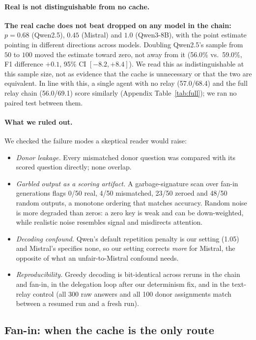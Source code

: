 \documentclass[11pt]{article}
\begin{document}
\paragraph{Real is not distinguishable from no cache.} \textbf{The real cache does
not beat dropped on any model in the chain:} $p=0.68$ (Qwen2.5), $0.45$ (Mistral) and
$1.0$ (Qwen3-8B), with the point estimate pointing in different
directions across models. Doubling Qwen2.5's sample from $50$ to $100$
moved the estimate toward zero, not away from it (56.0\% vs.\ 59.0\%, F1
difference $+0.1$, 95\% CI $[-8.2,+8.4]$). We read this as
indistinguishable at this sample size, not as evidence that the cache is
unnecessary or that the two are equivalent. In line with this, a single
agent with no relay (57.0/68.4) and the full relay chain (56.0/69.1) score
similarly (Appendix Table~\ref{tab:full}); we ran no paired test between
them.

\paragraph{What we ruled out.} We checked the failure modes a skeptical
reader would raise:
\begin{itemize}[leftmargin=*,itemsep=1pt,topsep=2pt]
\item \emph{Donor leakage.} Every mismatched donor question was compared with
its scored question directly; none overlap.
\item \emph{Garbled output as a scoring artifact.} A garbage-signature scan
over fan-in generations flags 0/50 real, 4/50 mismatched, 23/50 zeroed and
48/50 random outputs, a monotone ordering that matches accuracy. Random noise
is more degraded than zeros: a zero key is weak and can be down-weighted,
while realistic noise resembles signal and misdirects attention.
\item \emph{Decoding confound.} Qwen's default repetition penalty is our
setting (1.05) and Mistral's specifies none, so our setting corrects
\emph{more} for Mistral, the opposite of what an unfair-to-Mistral confound
needs.
\item \emph{Reproducibility.} Greedy decoding is bit-identical across reruns
in the chain and fan-in, in the delegation loop after our determinism fix, and in
the text-relay control (all 300 raw answers and all 100 donor assignments match
between a resumed run and a fresh run).
\end{itemize}

\subsection{Fan-in: when the cache is the only route}
\end{document}
